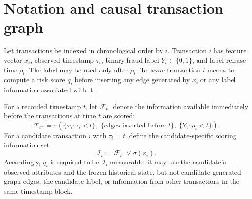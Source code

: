 \documentclass[11pt]{article}
\theoremstyle{definition}
\theoremstyle{remark}
\newcommand{\calF}{\mathcal{F}}
\begin{document}
\section{Notation and causal transaction graph}
\label{sec:causal-setting}

Let transactions be indexed in chronological order by $i$. Transaction $i$ has feature vector $x_i$, observed timestamp $\tau_i$, binary fraud label $Y_i\in\{0,1\}$, and label-release time $\rho_i$. The label may be used only after $\rho_i$. To \emph{score} transaction $i$ means to compute a risk score $q_i$ before inserting any edge generated by $x_i$ or any label information associated with it.

For a recorded timestamp $t$, let $\calF_{t^-}$ denote the information available immediately before the transactions at time $t$ are scored:
\[
    \calF_{t^-}
    =\sigma\!\left(\{x_i:\tau_i<t\},\;\{\text{edges inserted before }t\},\;\{Y_i:\rho_i<t\}\right).
\]
For a candidate transaction $i$ with $\tau_i=t$, define the candidate-specific scoring information set
\[
    \mathcal I_i:=\calF_{t^-}\vee\sigma(x_i).
\]
Accordingly, $q_i$ is required to be $\mathcal I_i$-measurable: it may use the candidate's observed attributes and the frozen historical state, but not candidate-generated graph edges, the candidate label, or information from other transactions in the same timestamp block.
\end{document}
